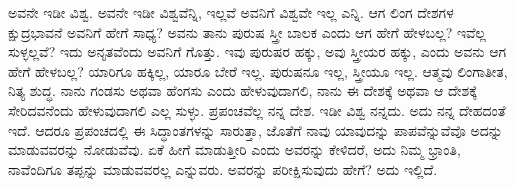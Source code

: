 \vskip 0.2cm

ಅವನೇ ಇಡೀ ವಿಶ್ವ. ಅವನೇ ಇಡೀ ವಿಶ್ವವೆನ್ನಿ, ಇಲ್ಲವೆ ಅವನಿಗೆ ವಿಶ್ವವೇ ಇಲ್ಲ ಎನ್ನಿ. ಆಗ ಲಿಂಗ ದೇಶಗಳ ಕ್ಷುದ್ರಭಾವನೆ ಅವನಿಗೆ ಹೇಗೆ ಸಾಧ್ಯ? ಅವನು ತಾನು ಪುರುಷ ಸ್ತ್ರೀ ಬಾಲಕ ಎಂದು ಆಗ ಹೇಗೆ ಹೇಳಬಲ್ಲ? ಇವೆಲ್ಲ ಸುಳ್ಳಲ್ಲವೆ? ಇದು ಅನೃತವೆಂದು ಅವನಿಗೆ ಗೊತ್ತು. ಇವು ಪುರುಷರ ಹಕ್ಕು, ಅವು ಸ್ತ್ರೀಯರ ಹಕ್ಕು, ಎಂದು ಅವನು ಆಗ ಹೇಗೆ ಹೇಳಬಲ್ಲ? ಯಾರಿಗೂ ಹಕ್ಕಿಲ್ಲ, ಯಾರೂ ಬೇರೆ ಇಲ್ಲ. ಪುರುಷನೂ ಇಲ್ಲ, ಸ್ತ್ರೀಯೂ ಇಲ್ಲ. ಆತ್ಮವು ಲಿಂಗಾತೀತ, ನಿತ್ಯ ಶುದ್ಧ. ನಾನು ಗಂಡಸು ಅಥವಾ ಹೆಂಗಸು ಎಂದು ಹೇಳುವುದಾಗಲಿ, ನಾನು ಈ ದೇಶಕ್ಕೆ ಅಥವಾ ಆ ದೇಶಕ್ಕೆ ಸೇರಿದವನೆಂದು ಹೇಳುವುದಾಗಲಿ ಎಲ್ಲ ಸುಳ್ಳು. ಪ್ರಪಂಚವೆಲ್ಲ ನನ್ನ ದೇಶ. ಇಡೀ ವಿಶ್ವ ನನ್ನದು. ಅದು ನನ್ನ ದೇಹದಂತೆ ಇದೆ. ಆದರೂ ಪ್ರಪಂಚದಲ್ಲಿ ಈ ಸಿದ್ಧಾಂತಗಳನ್ನು ಸಾರುತ್ತಾ, ಜೊತೆಗೆ ನಾವು ಯಾವುದನ್ನು ಪಾಪವೆನ್ನುವೆವೊ ಅದನ್ನು ಮಾಡುವವರನ್ನು ನೋಡುವೆವು. ಏಕೆ ಹೀಗೆ ಮಾಡುತ್ತೀರಿ ಎಂದು ಅವರನ್ನು ಕೇಳಿದರೆ, ಅದು ನಿಮ್ಮ ಭ್ರಾಂತಿ, ನಾವೆಂದಿಗೂ ತಪ್ಪನ್ನು ಮಾಡುವವರಲ್ಲ ಎನ್ನುವರು. ಅವರನ್ನು ಪರೀಕ್ಷಿಸುವುದು ಹೇಗೆ? ಅದು ಇಲ್ಲಿದೆ.

\vskip 0.2cm

